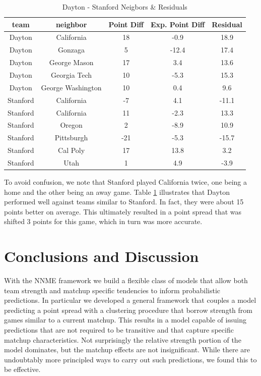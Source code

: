 \documentclass[letterpaper,12pt]{article}
\begin{document}
\begin{table}[h!]
\caption{Dayton - Stanford Neigbors \& Residuals}
\small
\centering
\begin{tabular}{|c|cccc |}
   \hline
   \hline
 team & neighbor &  Point Diff& Exp. Point Diff & Residual \\
  \hline
Dayton & California & 18 & -0.9 & 18.9\\
Dayton & Gonzaga & 5 & -12.4 & 17.4\\
Dayton & George Mason& 17 & 3.4 & 13.6\\
Dayton &  Georgia Tech& 10 & -5.3 & 15.3\\
Dayton & George Washington& 10 & 0.4 & 9.6\\
\hline
Stanford & California&-7 & 4.1&-11.1 \\
Stanford & California &11 &-2.3 &13.3 \\
Stanford & Oregon&2 &-8.9 &10.9 \\
Stanford & Pittsburgh&-21 &-5.3 &-15.7 \\
Stanford & Cal Poly&17 &13.8 &3.2 \\
Stanford & Utah&1 &4.9 &-3.9 \\
   \hline
   \hline
\end{tabular}
\label{tab:DayStan}
\end{table}
To avoid confusion, we note that Stanford played California twice, one being a home and the other being an away game.  Table \ref{tab:DayStan} illustrates that Dayton performed well against teams similar to Stanford. In fact, they were about 15 points better on average. This ultimately resulted in a point spread that was shifted 3 points for this game, which in turn was more accurate.

\section{Conclusions and Discussion}
With the NNME framework we build a flexible class of models that allow both team strength and matchup specific tendencies to inform probabilistic predictions. In particular we developed a general framework that couples a model predicting a point spread with a clustering procedure that borrow strength from games similar to a current matchup. This results in a model capable of issuing predictions that are not required to be transitive and that capture specific matchup characteristics. Not surprisingly the relative strength portion of the model dominates, but the matchup effects are not insignificant. While there are undoubtably more principled ways to carry out such predictions, we found this to be effective.
\end{document}
